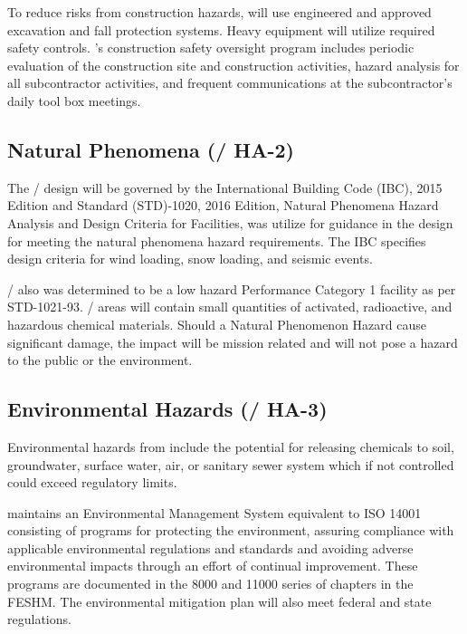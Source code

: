 To reduce risks from construction hazards, \fnal will use
engineered and approved excavation and fall protection systems.  Heavy
equipment will utilize required safety controls. \fnal's
construction safety oversight program includes periodic evaluation of
the construction site and construction activities, hazard analysis for
all subcontractor activities, and frequent  communications at the
subcontractor's daily tool box meetings.

\subsection{Natural Phenomena (/ HA-2)}

The / design will be governed by the International Building
Code (IBC), 2015 Edition and  Standard (STD)-1020, 2016 Edition,
Natural Phenomena Hazard Analysis and Design Criteria for 
Facilities, was utilize for guidance in the design for meeting the
natural phenomena hazard requirements.  The IBC specifies design
criteria for wind loading, snow loading, and seismic events.

/ also was determined to be a low hazard Performance Category
1 facility as per  STD-1021-93. / areas will contain small
quantities of activated, radioactive, and hazardous chemical
materials. Should a Natural Phenomenon Hazard cause significant
damage, the impact will be mission related and will not pose a hazard
to the public or the environment.

\subsection{Environmental Hazards (/ HA-3)}

Environmental hazards from  include the potential for releasing
chemicals to soil, groundwater, surface water, air, or sanitary sewer
system which if not controlled could exceed regulatory limits.

\fnal maintains an Environmental Management System equivalent to
ISO 14001 consisting of programs for protecting the environment,
assuring compliance with applicable environmental regulations and
standards and avoiding adverse environmental impacts through an effort
of continual improvement.  These programs are documented in the 8000
and 11000 series of chapters in the FESHM.  The environmental
mitigation plan will also meet federal and state regulations.


